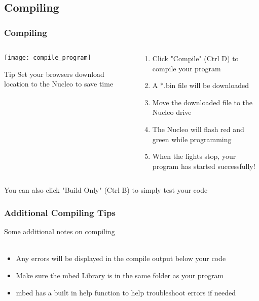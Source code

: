 \subsection{Compiling}
\label{sub:compiling}
\begin{frame}
	\frametitle{Compiling}
	\begin{columns}[c]
		\begin{column}{0.5\textwidth}
			\texttt{[image: compile\_program]}
			\begin{block}{Tip}
				Set your browsers download location to the Nucleo to save time
			\end{block}
		\end{column}
		\begin{column}{0.5\textwidth}
			\begin{enumerate}
				\item Click "Compile" (Ctrl D) to compile your program
				\item A *.bin file will be downloaded
				\item Move the downloaded file to the Nucleo drive
				\item The Nucleo will flash red and green while programming
				\item When the lights stop, your program has started successfully!
			\end{enumerate}
		\end{column}
	\end{columns}
	\begin{center}
		You can also click "Build Only" (Ctrl B) to simply test your code
	\end{center}
\end{frame}

\begin{frame}
	\frametitle{Additional Compiling Tips}
		Some additional notes on compiling \ \\ \ \\
			\begin{itemize}
				\item Any errors will be displayed in the compile output below your code
				\item Make sure the mbed Library is in the same folder as your program
				\item mbed has a built in help function to help troubleshoot errors if needed
			\end{itemize}

\end{frame}